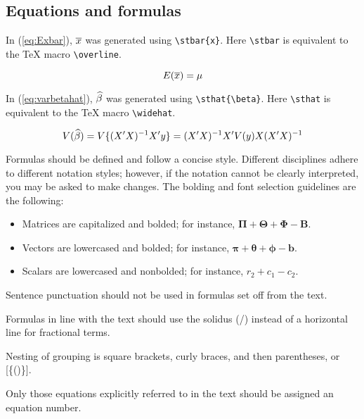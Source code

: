\subsection{Equations and formulas}

In (\ref{eq:Exbar}), $\overline{x}$ was generated using
\verb+\stbar{x}+.  Here \verb+\stbar+ is equivalent to the \TeX{} macro
\verb+\overline+.

\begin{equation}
E(\overline{x}) = \mu
\label{eq:Exbar}
\end{equation}

In (\ref{eq:varbetahat}), $\widehat{\beta}$ was generated using
\verb+\sthat{\beta}+.  Here \verb+\sthat+ is equivalent to the \TeX{} macro
\verb+\widehat+.

\begin{equation}
V(\widehat{\beta}) = V\{(X'X)^{-1}X'y\} = (X'X)^{-1}X'V(y)X(X'X)^{-1}
\label{eq:varbetahat}
\end{equation}

\clearpage

Formulas should be defined and follow a concise style. Different
disciplines adhere to different notation styles; however, if the
notation cannot be clearly interpreted, you may be asked to make
changes. The bolding and font selection guidelines are the following:

\begin{itemize}
\item
	Matrices are capitalized and bolded; for instance, $\boldsymbol\Pi +
	\boldsymbol\Theta + \boldsymbol\Phi - \mathbf{B}$.

\item
	Vectors are lowercased and bolded; for instance, $\boldsymbol\pi +
	\boldsymbol\theta + \boldsymbol\phi - \mathbf{b}$.

\item
        Scalars are lowercased and nonbolded; for instance, $r_2 + c_1 - c_2$.
\end{itemize}


Sentence punctuation should not be used in formulas set off from the text.

Formulas in line with the text should use the solidus (/) instead of a
horizontal line for fractional terms.

Nesting of grouping is square brackets, curly braces, and then parentheses, or
[\{()\}].

Only those equations explicitly referred to in the text should be assigned an
equation number.

